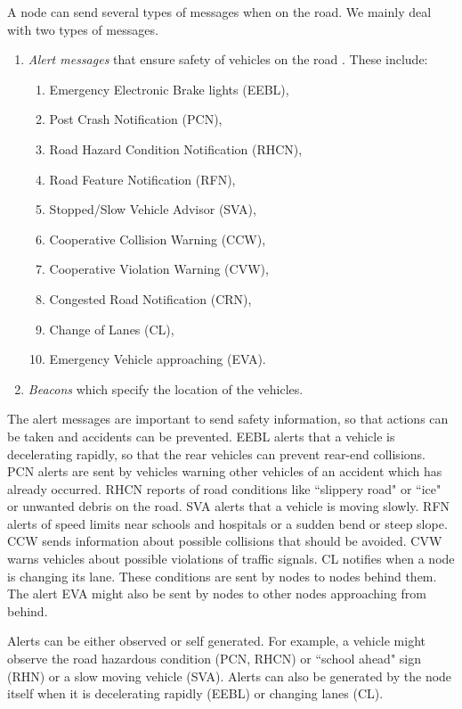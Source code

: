 \documentclass[conference]{IEEEtran}[10pt]
\begin{document}
A node can send several types of messages when on the road. 
We mainly deal with two types of messages. 

\begin{enumerate}

\item \emph{Alert messages} that ensure safety of vehicles on the road \cite{BKVHE06}. These include:

\begin{enumerate}
\item Emergency Electronic Brake lights (EEBL), 
\item Post Crash Notification (PCN), 
\item Road Hazard Condition Notification (RHCN), 
\item Road Feature Notification (RFN), 
\item Stopped/Slow Vehicle Advisor (SVA), 
\item Cooperative Collision Warning (CCW),
\item Cooperative Violation Warning (CVW),  
\item Congested Road Notification (CRN), 
\item Change of Lanes (CL),
\item Emergency Vehicle approaching (EVA). 
\end{enumerate}
\item \emph{Beacons} which specify the location of the vehicles. 
\end{enumerate}


The alert messages are important to send safety information, so that actions can be taken and accidents can be prevented. 
EEBL alerts that a vehicle is decelerating rapidly, so that the rear vehicles can prevent rear-end collisions. 
PCN alerts are sent by vehicles warning other vehicles of an accident which has already occurred. 
RHCN reports of road conditions like ``slippery road" or ``ice" or unwanted debris on the road. 
SVA alerts that a vehicle is moving slowly. 
RFN alerts of speed limits near schools and hospitals or a sudden bend or steep slope. 
CCW sends information about possible collisions that should be avoided. 
CVW warns vehicles about possible violations of traffic signals. 
CL notifies when a node is changing its lane.
These conditions are sent by nodes to nodes behind them. 
The alert EVA might also be sent by nodes to other nodes approaching from behind. 

Alerts can be either observed or self generated. 
For example, a vehicle might observe the road hazardous condition (PCN, RHCN) or ``school ahead" sign (RHN) or a slow moving vehicle (SVA). 
Alerts can also be generated by the node itself when it is decelerating rapidly (EEBL) or changing lanes (CL).
\end{document}

